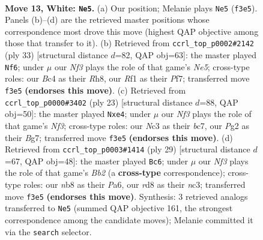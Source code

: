 \documentclass[11pt]{article}
\begin{document}
\clearpage

\begin{figure}[p]\centering
\begin{subfigure}{0.46\textwidth}\centering
\resizebox{\linewidth}{!}{%
\newchessgame
\chessboard[
  setfen={rnbr2k1/1p3p2/4pn1p/p1b3p1/2B5/2N1PNB1/PP3PPP/R4RK1 w - - 0 13},
  showmover=false,
  pgfstyle=straightmove, color=movearrow, markmove={f3-e5}
]}
\caption{}
\end{subfigure}\hfill
\begin{subfigure}{0.46\textwidth}\centering
\resizebox{\linewidth}{!}{%
\newchessgame
\chessboard[
  setfen={r6r/p3kp2/1p1bp2p/2pb4/P3n3/4BNP1/1P2PPBP/R2R2K1 b - - 0 17},
  showmover=false,
  pgfstyle=straightmove, color=movearrow, markmove={e4-f6}
]}
\caption{}
\end{subfigure}
\\[4pt]
\begin{subfigure}{0.46\textwidth}\centering
\resizebox{\linewidth}{!}{%
\newchessgame
\chessboard[
  setfen={r1b2rk1/2B1ppbp/p1n2np1/8/Np1PP3/5N2/PP2BPPP/R3K2R b KQ - 1 12},
  showmover=false,
  pgfstyle=straightmove, color=movearrow, markmove={f6-e4}
]}
\caption{}
\end{subfigure}\hfill
\begin{subfigure}{0.46\textwidth}\centering
\resizebox{\linewidth}{!}{%
\newchessgame
\chessboard[
  setfen={r3kb1r/1b1p1ppp/p3pn2/8/4P3/P1NBBP2/2P3PP/R3K2R b KQkq - 0 15},
  showmover=false,
  pgfstyle=straightmove, color=movearrow, markmove={b7-c6}
]}
\caption{}
\end{subfigure}
\caption{\textbf{Move 13, White: \texttt{Ne5}.} (a) Our position; Melanie plays \texttt{Ne5} (\texttt{f3e5}). Panels (b)--(d) are the retrieved master positions whose correspondence most drove this move (highest QAP objective among those that transfer to it). (b) Retrieved from \texttt{ccrl\_top\_p0002\#2142} (ply 33) [structural distance $d$=82, QAP obj=63]: the master played \texttt{Nf6}; under $\mu$ our \emph{Nf3} plays the role of that game's \emph{Ne5}; cross-type roles: our \emph{B}c4 as their \emph{R}h8, our \emph{R}f1 as their \emph{P}f7; transferred move \texttt{f3e5} \textbf{(endorses this move)}. (c) Retrieved from \texttt{ccrl\_top\_p0000\#3402} (ply 23) [structural distance $d$=88, QAP obj=50]: the master played \texttt{Nxe4}; under $\mu$ our \emph{Nf3} plays the role of that game's \emph{Nf3}; cross-type roles: our \emph{N}c3 as their \emph{b}c7, our \emph{P}g2 as their \emph{B}g7; transferred move \texttt{f3e5} \textbf{(endorses this move)}. (d) Retrieved from \texttt{ccrl\_top\_p0003\#1414} (ply 29) [structural distance $d$=67, QAP obj=48]: the master played \texttt{Bc6}; under $\mu$ our \emph{Nf3} plays the role of that game's \emph{Bb2} (a \textbf{cross-type} correspondence); cross-type roles: our \emph{n}b8 as their \emph{P}a6, our \emph{r}d8 as their \emph{n}c3; transferred move \texttt{f3e5} \textbf{(endorses this move)}. Synthesis: 3 retrieved analogs transferred to \texttt{Ne5} (summed QAP objective 161, the strongest correspondence among the candidate moves); Melanie committed it via the \texttt{search} selector.}
\label{fig:thought-m24}
\end{figure}
\end{document}
